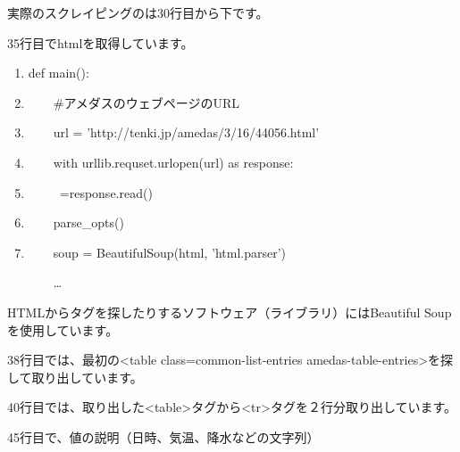 \documentclass[a4paper,12pt,dvipdfmx]{jarticle}
\begin{document}
\bigskip

\clearpage
実際のスクレイピングのは30行目から下です。

35行目でhtmlを取得しています。

\begin{center}
\begin{boxedminipage}{16.947cm}
\begin{enumerate}
\setlength{\itemsep}{0cm} %
\setcounter{enumi}{29}
\item def main():
\item \ \ \ \ \#アメダスのウェブページのURL
\item \ \ \ \ url = 'http://tenki.jp/amedas/3/16/44056.html'
\item \ \ \ \ with urllib.requset.urlopen(url) as response:
\item  \ \ \ \ \ \html=response.read()
\item \ \ \ \ parse\_opts()
\item \ \ \ \ soup = BeautifulSoup(html, 'html.parser')

\ \ \ \ …
\end{enumerate}
\end{boxedminipage}
\end{center}
HTMLからタグを探したりするソフトウェア（ライブラリ）にはBeautiful
Soupを使用しています。

38行目では、最初の{\textless}table class={\textquotedbl}common-list-entries
amedas-table-entries{\textquotedbl}{\textgreater}を探して取り出しています。

40行目では、取り出した{\textless}table{\textgreater}タグから{\textless}tr{\textgreater}タグを２行分取り出しています。

45行目で、値の説明（日時、気温、降水などの文字列）
\end{document}
